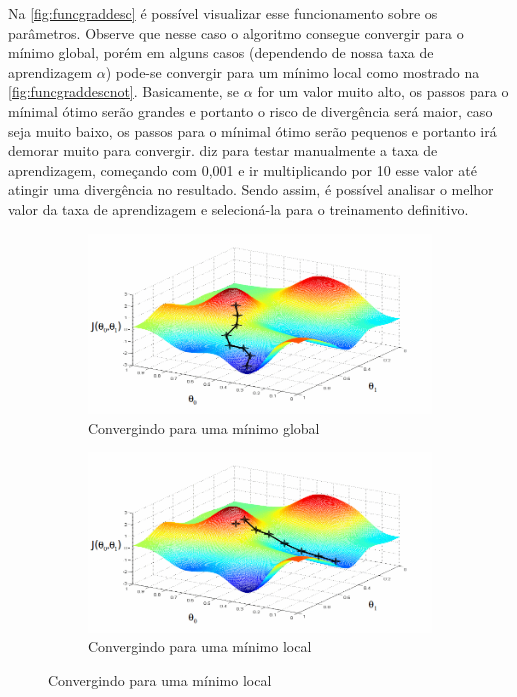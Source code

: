 Na \autoref{fig:funcgraddesc} é possível visualizar esse funcionamento sobre os parâmetros. Observe que nesse caso o algoritmo consegue convergir para o mínimo global, porém em alguns casos (dependendo de nossa taxa de aprendizagem $ \alpha $) pode-se convergir para um mínimo local como mostrado na \autoref{fig:funcgraddescnot}. Basicamente, se $\alpha$ for um valor muito alto, os passos para o mínimal ótimo serão grandes e portanto o risco de divergência será maior, caso seja muito baixo, os passos para o mínimal ótimo serão pequenos e portanto irá demorar muito para convergir.  diz para testar manualmente a taxa de aprendizagem, começando com 0,001 e ir multiplicando por 10 esse valor até atingir uma divergência no resultado. Sendo assim, é possível analisar o melhor valor da taxa de aprendizagem e selecioná-la para o treinamento definitivo. 

\begin{figure}
  \caption{Funcionamento do Gradiente Descendente}
  \begin{subfigure}[htb]{0.5\textwidth} 
    \includegraphics[width=\textwidth]{img/funcgraddesc1}
    \caption{Convergindo para uma mínimo global} \label{fig:funcgraddesc}
  \end{subfigure}
  \begin{subfigure}[htb]{0.5\textwidth} 
    \includegraphics[width=\textwidth]{img/funcgraddesc2}
    \caption{Convergindo para uma mínimo local} \label{fig:funcgraddescnot}
  \end{subfigure}

\end{figure}

